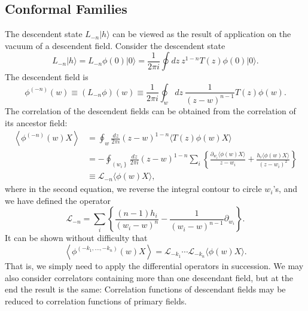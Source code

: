 \documentclass[aps,prb,superscriptaddress,nofootinbib]{revtex4}
\begin{document}
\subsection{Conformal Families}
The descendent state $L_{-n}|h\rangle$ can be viewed as the result of application on the vacuum of a descendent field.
Consider the descendent state
\begin{equation}
	L_{-n}|h\rangle=L_{-n} \phi(0)|0\rangle=\frac{1}{2 \pi i} \oint d z\ z^{1-n} T(z) \phi(0)|0\rangle.
\end{equation}
The descendent field is
\begin{equation}
	\phi^{(-n)}(w) \equiv (L_{-n}\phi)(w) \equiv \frac{1}{2 \pi i} \oint_{w} d z\ \frac{1}{(z-w)^{n-1}} T(z) \phi(w).
\end{equation}
The correlation of the descendent fields can be obtained from the correlation of its ancestor field:
\begin{equation}
\begin{aligned}
	\left\langle\phi^{(-n)}(w) X\right\rangle
	&=  \oint_{w} \frac{dz}{2 \pi i} (z-w)^{1-n}\langle T(z) \phi(w) X\rangle \\
	&= - \oint_{\left(w_{i}\right\}} \frac{d z}{2\pi i}(z-w)^{1-n} \sum_{i}\left\{\frac{\partial_{w_{i}}\langle\phi(w) X\rangle}{z-w_{i}} + \frac{h_{i} \langle\phi(w) X\rangle}{\left(z-w_{i}\right)^{2}}\right\} \\
	& \equiv \mathcal{L}_{-n}\langle\phi(w) X\rangle,
\end{aligned}
\end{equation}
where in the second equation, we reverse the integral contour to circle $w_i$'s, and we have defined the operator
\begin{equation}
	\mathcal{L}_{-n}=\sum_{i}\left\{\frac{(n-1) h_{i}}{\left(w_{i}-w\right)^{n}}-\frac{1}{\left(w_{i}-w\right)^{n-1}} \partial_{w_{i}}\right\}.
\end{equation}
It can be shown without difficulty that
\begin{equation}
	\left\langle\phi^{\left(-k_{1}, \ldots,-k_{n}\right)}(w) X\right\rangle=\mathcal{L}_{-k_{1}} \cdots \mathcal{L}_{-k_{n}}\langle\phi(w) X\rangle.
\end{equation}
That is, we simply need to apply the differential operators in succession. We may also consider correlators containing more than one descendant field, but at the end the result is the same: Correlation functions of descendant fields may be reduced to correlation functions of primary fields.
\end{document}
